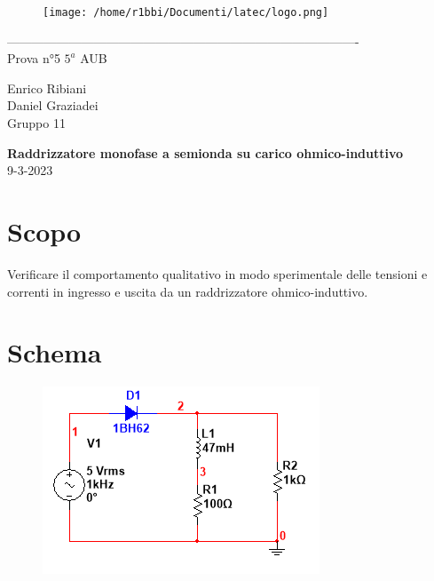 \documentclass[12pt]{article}
\begin{document}
\begin{titlepage}
	\begin{center}
		\begin{figure}
			\centering
			\texttt{[image: /home/r1bbi/Documenti/latec/logo.png]}

		\end{figure}
		-------------------------------------------------------------------------------------\\
		\vspace{2\baselineskip}
		\large Prova n°5
		\hfill
		\large $5^a$   AUB\\
		\begin{flushleft}
			\large Enrico Ribiani\\
			\large Daniel Graziadei\\
			\large Gruppo 11\\
		\end{flushleft}


		\vfill

		\Huge{\textbf{Raddrizzatore monofase a semionda su carico ohmico-induttivo }}\\
		\vfill
		\vfill
		\large{9-3-2023}
	\end{center}
\end{titlepage}
\thispagestyle{empty}
\tableofcontents
\newpage
\setcounter{page}{1}
\vskip 1cm
\section{Scopo}
Verificare il comportamento qualitativo in modo sperimentale delle tensioni  e correnti in
ingresso e uscita da un raddrizzatore ohmico-induttivo.\\

\section{Schema}
\begin{figure}[!h]
	\includegraphics[scale=0.7]{schema.PNG}
\end{figure}
\end{document}
